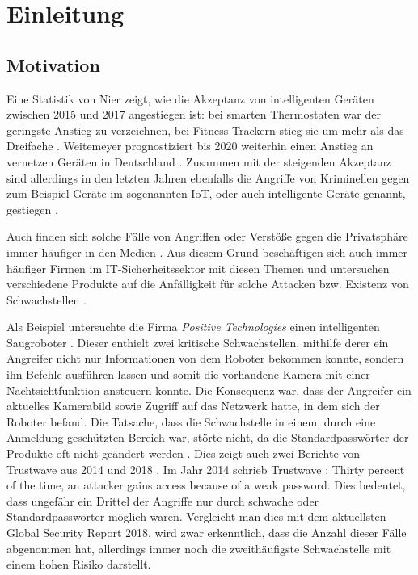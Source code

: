 \chapter{Einleitung}

\section{Motivation}
Eine Statistik von Nier zeigt, wie die Akzeptanz von intelligenten Geräten zwischen 2015 und 2017 angestiegen ist: bei smarten Thermostaten war der geringste Anstieg zu verzeichnen, bei Fitness-Trackern stieg sie um mehr als das Dreifache \cite{nier_2017}. Weitemeyer prognostiziert bis 2020 weiterhin einen Anstieg an vernetzen Geräten in Deutschland \cite{weitemeyer_2018}.
Zusammen mit der steigenden Akzeptanz sind allerdings in den letzten Jahren ebenfalls die Angriffe von Kriminellen gegen zum Beispiel Geräte im sogenannten \ac{IoT}, oder auch intelligente Geräte genannt, gestiegen \cite{statista_2019}.

Auch finden sich solche Fälle von Angriffen oder Verstöße gegen die Privatsphäre immer häufiger in den Medien \cite{holland_2016,it_verlag_informationstechnik_gmbh_2018}. Aus diesem Grund beschäftigen sich auch immer häufiger Firmen im IT-Sicherheitssektor mit diesen Themen und untersuchen verschiedene Produkte auf die Anfälligkeit für solche Attacken bzw. Existenz von Schwachstellen \cite{lorenz_2018,ao_kaspersky_lab_2018}.

Als Beispiel untersuchte die Firma \emph{Positive Technologies} einen intelligenten Saugroboter \cite{salmi_2017}.
Dieser enthielt zwei kritische Schwachstellen, mithilfe derer ein Angreifer nicht nur Informationen von dem Roboter bekommen konnte, sondern ihn Befehle ausführen lassen und somit die vorhandene Kamera mit einer Nachtsichtfunktion ansteuern konnte. Die Konsequenz war, dass der Angreifer ein aktuelles Kamerabild sowie Zugriff auf das Netzwerk hatte, in dem sich der Roboter befand. Die Tatsache, dass die Schwachstelle in einem, durch eine Anmeldung geschützten Bereich war, störte nicht, da die Standardpasswörter der Produkte oft nicht geändert werden \cite{positive_technologies_2018}.
Dies zeigt auch zwei Berichte von Trustwave aus 2014 und 2018 \cite{trustwave_holdings_inc_2014,trustwave_holdings_inc_2018}.
Im Jahr 2014 schrieb Trustwave \cite{trustwave_holdings_inc_2014}: \glqq Thirty percent of the time, an attacker gains access because of a weak password.\grqq{}
Dies bedeutet, dass ungefähr ein Drittel der Angriffe nur durch schwache oder Standardpasswörter möglich waren. Vergleicht man dies mit dem aktuellsten Global Security Report 2018, wird zwar erkenntlich, dass die Anzahl dieser Fälle abgenommen hat, allerdings immer noch die zweithäufigste Schwachstelle mit einem hohen Risiko darstellt.

